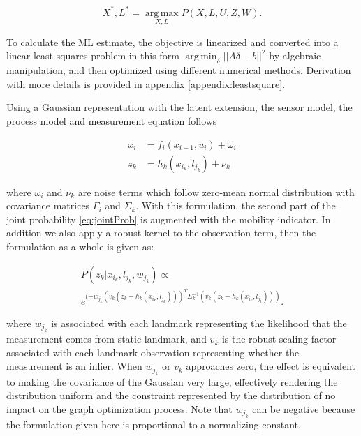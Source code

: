 \begin{equation}
X^*, L^* = \operatorname*{arg\,max}_{X,L} P(X,L,U,Z,W).
\end{equation}

To calculate the ML estimate, the objective is linearized and converted into a linear least
squares problem in this form $\operatorname*{arg\,min}_{\delta} || A
\delta  - b ||^2$ by algebraic manipulation, and then optimized using
different numerical methods. Derivation with more details is provided in appendix \ref{appendix:leastsquare}.

Using a Gaussian representation with the latent extension, the sensor
model, the process model and measurement equation follows

\begin{equation}
\begin{aligned}
x_i &= f_i(x_{i-1}, u_i) + \omega_i \\
z_k &= h_k(x_{i_k}, l_{j_k}) + \nu_k
\end{aligned}
\label{eq:gaussRepresentation}
\end{equation}

where $\omega_i$ and $\nu_k$ are noise terms which follow zero-mean normal distribution with covariance matrices $\Gamma_i$ and $\Sigma_k$. With this formulation, the second part of the joint probability \ref{eq:jointProb} is augmented with the mobility indicator. In addition we also apply a robust kernel to the observation term, then the formulation as a whole is given as:

\begin{multline}
P(z_k|x_{i_k}, l_{j_k}, w_{j_k})\propto \\
 e^{(-w_{j_k} (v_k(z_k - h_k(x_{i_k}, l_{j_k})))^T \Sigma_k^{-1} (v_k(z_k - h_k(x_{i_k}, l_{j_k}))) }.
\label{eq:sensor}
\end{multline}

where $w_{j_k}$ is associated with each landmark representing the likelihood that the measurement comes from static landmark, and $v_k$ is the robust scaling factor associated with each landmark observation representing whether the measurement is an inlier. When $w_{j_k}$ or $v_k$ approaches zero, the effect is equivalent to making the covariance of the Gaussian very large, effectively rendering the distribution uniform and the constraint represented by the distribution of no impact on the graph optimization process. Note that $w_{j_k}$ can be negative because the formulation given here is proportional to a normalizing constant.
